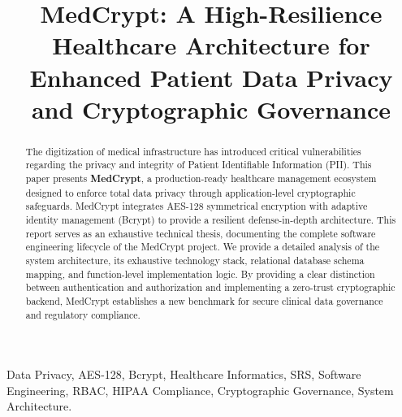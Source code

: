\documentclass[conference,onecolumn]{IEEEtran}
\begin{document}
\title{MedCrypt: A High-Resilience Healthcare Architecture for Enhanced Patient Data Privacy and Cryptographic Governance}

\author{
\and
{}
\and
{}
\and
{}
}

\maketitle

\begin{abstract}
The digitization of medical infrastructure has introduced critical vulnerabilities regarding the privacy and integrity of Patient Identifiable Information (PII). This paper presents \textbf{MedCrypt}, a production-ready healthcare management ecosystem designed to enforce total data privacy through application-level cryptographic safeguards. MedCrypt integrates AES-128 symmetrical encryption with adaptive identity management (Bcrypt) to provide a resilient defense-in-depth architecture. This report serves as an exhaustive technical thesis, documenting the complete software engineering lifecycle of the MedCrypt project. We provide a detailed analysis of the system architecture, its exhaustive technology stack, relational database schema mapping, and function-level implementation logic. By providing a clear distinction between authentication and authorization and implementing a zero-trust cryptographic backend, MedCrypt establishes a new benchmark for secure clinical data governance and regulatory compliance.
\end{abstract}

\begin{IEEEkeywords}
Data Privacy, AES-128, Bcrypt, Healthcare Informatics, SRS, Software Engineering, RBAC, HIPAA Compliance, Cryptographic Governance, System Architecture.
\end{IEEEkeywords}
\end{document}
